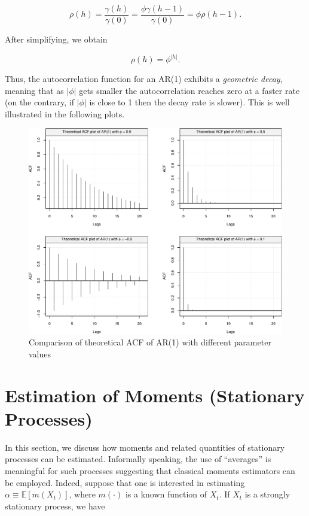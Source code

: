 \documentclass[]{book}
\theoremstyle{definition}
\theoremstyle{definition}
\theoremstyle{definition}
\theoremstyle{remark}
\begin{document}
\[\rho \left( h \right) = \frac{{\gamma \left( h \right)}}{{\gamma \left( 0 \right)}} = \frac{{\phi \gamma \left( {h - 1} \right)}}{{\gamma \left( 0 \right)}} = \phi \rho \left( {h - 1} \right).\]

After simplifying, we obtain

\[\rho \left( h \right) = {\phi^{|h|}}.\]

Thus, the autocorrelation function for an AR(1) exhibits a
\emph{geometric decay}, meaning that as \(|\phi|\) gets smaller the
autocorrelation reaches zero at a faster rate (on the contrary, if
\(|\phi|\) is close to 1 then the decay rate is slower). This is well
illustrated in the following plots.

\begin{figure}

{\centering \includegraphics{ts_files/figure-latex/AR1theoACF-1} 

}

\caption{Comparison of theoretical ACF of AR(1) with different parameter values}\label{fig:AR1theoACF}
\end{figure}

\hypertarget{estimation-of-moments-stationary-processes}{%
\section{Estimation of Moments (Stationary
Processes)}\label{estimation-of-moments-stationary-processes}}

In this section, we discuss how moments and related quantities of
stationary processes can be estimated. Informally speaking, the use of
``averages'' is meaningful for such processes suggesting that classical
moments estimators can be employed. Indeed, suppose that one is
interested in estimating \(\alpha \equiv \mathbb{E}[m (X_t)]\), where
\(m(\cdot)\) is a known function of \(X_t\). If \(X_t\) is a strongly
stationary process, we have
\end{document}
